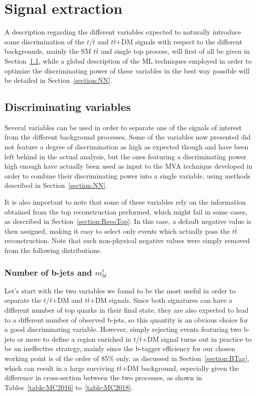 \documentclass[a4paper, 10pt, openright]{report}
\begin{document}
\section{Signal extraction} \label{section:Discrimination}

A description regarding the different variables expected to naturally introduce some discrimination of the $t/\bar t$ and $t \bar t$+DM signals with respect to the different backgrounds, mainly the \ac{SM} $t \bar t$ and single top process, will first of all be given in Section~\ref{section:Variables}, while a global description of the \ac{ML} techniques employed in order to optimize the discriminating power of these variables in the best way possible will be detailed in Section~\ref{section:NN}.

\subsection{Discriminating variables} \label{section:Variables}

Several variables can be used in order to separate one of the signals of interest from the different background processes. Some of the variables now presented did not feature a degree of discrimination as high as expected though and have been left behind in the actual analysis, but the ones featuring a discriminating power high enough have actually been used as input to the \ac{MVA} technique developed in order to combine their discriminating power into a single variable, using methods described in Section~\ref{section:NN}. 

It is also important to note that some of these variables rely on the information obtained from the top reconstruction performed, which might fail in some cases, as described in Section~\ref{section:RecoTop}. In this case, a default negative value is then assigned, making it easy to select only events which actually pass the $t \bar t$ reconstruction. Note that such non-physical negative values were simply removed from the following distributions.

\subsubsection*{Number of b-jets and $m_{bl}^t$}

Let's start with the two variables we found to be the most useful in order to separate the $t/\bar t$+DM and $t \bar t$+DM signals. Since both signatures can have a different number of top quarks in their final state, they are also expected to lead to a different number of observed b-jets, so this quantity is an obvious choice for a good discriminating variable. However, simply rejecting events featuring two b-jets or more to define a region enriched in $t/ \bar t$+DM signal turns out in practice to be an ineffective strategy, mainly since the b-tagger efficiency for our chosen working point is of the order of 85\% only, as discussed in Section~\ref{section:BTag}, which can result in a large surviving $t \bar t$+DM background, especially given the difference in cross-section between the two processes, as shown in Tables~\ref{table:MC2016} to~\ref{table:MC2018}.
\end{document}
